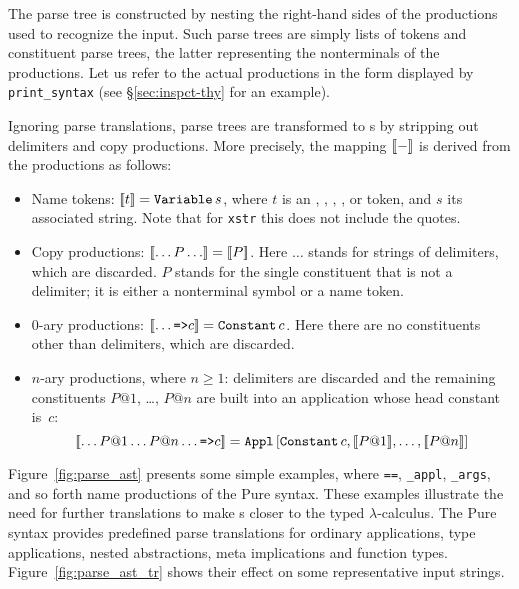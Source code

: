 The parse tree is constructed by nesting the right-hand sides of the
productions used to recognize the input.  Such parse trees are simply lists
of tokens and constituent parse trees, the latter representing the
nonterminals of the productions.  Let us refer to the actual productions in
the form displayed by {\tt print_syntax} (see \S\ref{sec:inspct-thy} for an
example).

Ignoring parse \AST{} translations, parse trees are transformed to \AST{}s
by stripping out delimiters and copy productions.  More precisely, the
mapping $\mathopen{[\![}-\mathclose{]\!]}$ is derived from the productions as follows:
\begin{itemize}
\item Name tokens: $\mathopen{[\![} t\mathclose{]\!]} = \mathop{\mbox{\tt Variable}}\nolimits s$, where $t$ is an ,
  , , ,  or  token, and $s$
  its associated string.  Note that for {\tt xstr} this does not include the
  quotes.

\item Copy productions:
  $\mathopen{[\![}\ldots P \ldots\mathclose{]\!]} = \mathopen{[\![} P\mathclose{]\!]}$.  Here $\ldots$ stands for
  strings of delimiters, which are discarded.  $P$ stands for the single
  constituent that is not a delimiter; it is either a nonterminal symbol or
  a name token.

  \item 0-ary productions: $\mathopen{[\![}\ldots \mbox{\tt =>} c\mathclose{]\!]} = \mathop{\mbox{\tt Constant}}\nolimits c$.
    Here there are no constituents other than delimiters, which are
    discarded.

  \item $n$-ary productions, where $n \ge 1$: delimiters are discarded and
    the remaining constituents $P@1$, \ldots, $P@n$ are built into an
    application whose head constant is~$c$:
    \[ \mathopen{[\![}\ldots P@1 \ldots P@n \ldots \mbox{\tt =>} c\mathclose{]\!]} =
       \mathop{\mbox{\tt Appl}}\nolimits\,[\mathop{\mbox{\tt Constant}}\nolimits c, \mathopen{[\![} P@1\mathclose{]\!]}, \ldots, \mathopen{[\![} P@n\mathclose{]\!]}]
    \]
\end{itemize}
Figure~\ref{fig:parse_ast} presents some simple examples, where {\tt ==},
{\tt _appl}, {\tt _args}, and so forth name productions of the Pure syntax.
These examples illustrate the need for further translations to make \AST{}s
closer to the typed $\lambda$-calculus.  The Pure syntax provides
predefined parse \AST{} translations for
ordinary applications, type applications, nested abstractions, meta
implications and function types.  Figure~\ref{fig:parse_ast_tr} shows their
effect on some representative input strings.


